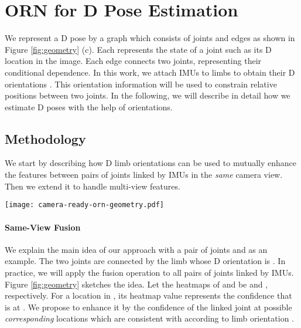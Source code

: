 \documentclass[10pt,twocolumn,letterpaper]{article}
\begin{document}
\section{ORN for D Pose Estimation}
We represent a D pose by a graph which consists of  joints  and  edges  as shown in Figure \ref{fig:geometry} (c). Each  represents the state of a joint such as its D location in the image. Each edge  connects two joints, representing their conditional dependence. In this work, we attach IMUs to  limbs to obtain their D orientations . This orientation information will be used to constrain relative positions between two joints. In the following, we will describe in detail how we estimate D poses with the help of orientations.


\subsection{Methodology}
We start by describing how D limb orientations can be used to mutually enhance the features between pairs of joints linked by IMUs in the \emph{same} camera view. Then we extend it to handle multi-view features.
\begin{figure*}[tp]
	\centering
	\texttt{[image: camera-ready-orn-geometry.pdf]}
	\caption{Illustration of the cross-joint-fusion idea in ORN. (a) For a location  in , we estimate its D points  lying on the line defined by the camera center  and . Then based on the D limb orientation provided by IMU and the limb length, we get candidate D locations of  which are denoted as . We project  to the image as  and get the corresponding heatmap confidence. If the confidence is high,  has high confidence being located at . (b) We enhance the initial confidence of  at  with the confidence of  at  in all views. Similarly, we can fuse the heatmap of  using that of . (c) We show the skeleton model used in this work. }
	\label{fig:geometry}
\end{figure*}

\paragraph{Same-View Fusion}
We explain the main idea of our approach with a pair of joints  and  as an example. The two joints are connected by the limb  whose D orientation is . In practice, we will apply the fusion operation to all pairs of joints linked by IMUs. Figure \ref{fig:geometry} sketches the idea. Let the heatmaps of  and  be  and , respectively. For a location  in , its heatmap value represents the confidence that  is at . We propose to enhance it by the confidence of the linked joint  at  possible \emph{corresponding} locations  which are consistent with  according to limb orientation . 
\end{document}
